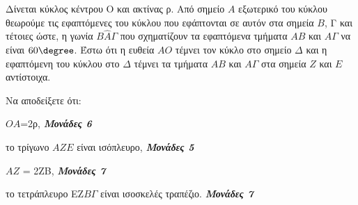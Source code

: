 \documentclass[11pt,a4paper,twoside]{book}
\newcommand{\monades}[1]{
\hspace*{\fill}
\textbf{\textit{\textcolor{maincolor}{Μονάδες #1}}}}
\begin{document}
Δίνεται κύκλος κέντρου Ο και ακτίνας ρ. Από σημείο $A$ εξωτερικό του κύκλου θεωρούμε τις εφαπτόμενες του κύκλου που εφάπτονται σε αυτόν στα σημεία $B$, Γ και τέτοιες ώστε, η γωνία $B\hat{A}\varGamma $ που σχηματίζουν τα εφαπτόμενα τμήματα $AB$ και $A\varGamma $ να είναι $60\degree$. Έστω ότι η ευθεία $AO$ τέμνει τον κύκλο στο σημείο $\varDelta  $ και η εφαπτόμενη του κύκλου στο $\varDelta$ τέμνει τα τμήματα $AB$ και $A\varGamma $ στα σημεία $Z$ και $E$ αντίστοιχα.

Να αποδείξετε ότι:

\begin{alist}
\item $OA$=2ρ, \monades{6}

\item το τρίγωνο $AZE$ είναι ισόπλευρο, \monades{5}

\item $AZ$ = 2ΖΒ, \monades{7}

\item το τετράπλευρο ΕΖ$B\varGamma $ είναι ισοσκελές τραπέζιο. \monades{7}


\begin{center}
\end{center}
\end{alist}
\end{document}
